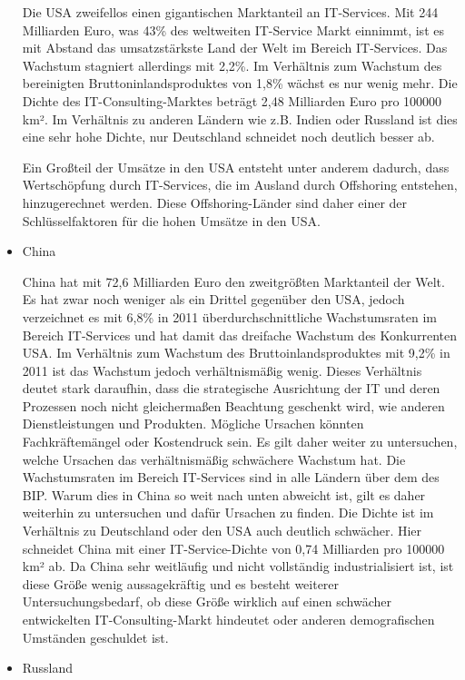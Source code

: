 \begin{itemize}
Die USA zweifellos einen gigantischen Marktanteil an IT-Services. Mit 244 Milliarden Euro, was 43\% des weltweiten IT-Service Markt einnimmt, ist es mit Abstand das umsatzstärkste Land der Welt im Bereich IT-Services. \cite{ibisUSA} Das Wachstum stagniert allerdings mit 2,2\%. Im Verhältnis zum Wachstum des bereinigten Bruttoninlandsproduktes von 1,8\% wächst es nur wenig mehr. \cite{statUSA} Die Dichte des IT-Consulting-Marktes beträgt 2,48 Milliarden Euro pro 100000 km². Im Verhältnis zu anderen Ländern wie z.B. Indien oder Russland ist dies eine sehr hohe Dichte, nur Deutschland schneidet noch deutlich besser ab.

Ein Großteil der Umsätze in den USA entsteht unter anderem dadurch, dass Wertschöpfung durch IT-Services, die im Ausland durch Offshoring entstehen, hinzugerechnet werden. Diese Offshoring-Länder sind daher einer der Schlüsselfaktoren für die hohen Umsätze in den USA. 

\item {China}

China hat mit 72,6 Milliarden Euro den zweitgrößten Marktanteil der Welt. Es hat zwar noch weniger als ein Drittel gegenüber den USA, jedoch verzeichnet es mit 6,8\% in 2011 überdurchschnittliche Wachstumsraten im Bereich IT-Services und hat damit das dreifache Wachstum des Konkurrenten USA.  Im Verhältnis zum Wachstum des Bruttoinlandsproduktes mit 9,2\% in 2011 ist das Wachstum jedoch verhältnismäßig wenig. Dieses Verhältnis deutet stark daraufhin, dass die strategische Ausrichtung der IT und deren Prozessen noch nicht gleichermaßen Beachtung geschenkt wird, wie anderen Dienstleistungen und Produkten. Mögliche Ursachen könnten Fachkräftemängel oder Kostendruck sein. Es gilt daher weiter zu untersuchen, welche Ursachen das verhältnismäßig schwächere Wachstum hat. 
Die Wachstumsraten im Bereich IT-Services sind in alle Ländern über dem des BIP. Warum dies in China so weit nach unten abweicht ist, gilt es daher weiterhin zu untersuchen und dafür Ursachen zu finden.
Die Dichte ist im Verhältnis zu Deutschland oder den USA auch deutlich schwächer. Hier schneidet China mit einer IT-Service-Dichte von 0,74 Milliarden pro 100000 km² ab. Da China sehr weitläufig und nicht vollständig industrialisiert ist, ist diese Größe wenig aussagekräftig und es besteht weiterer Untersuchungsbedarf, ob diese Größe wirklich auf einen schwächer entwickelten IT-Consulting-Markt hindeutet oder anderen demografischen Umständen geschuldet ist. \cite{ibisChina}

\item {Russland}


\end{itemize}
